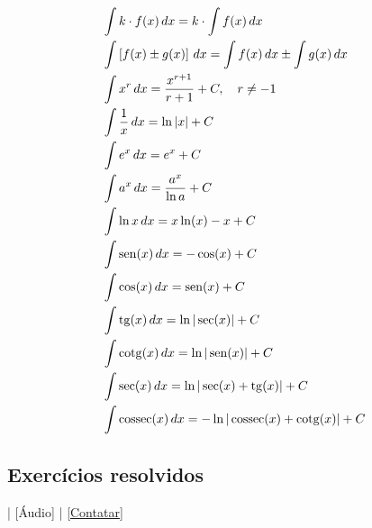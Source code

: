 \begin{small}
\begin{align}
  & \int k\cdot f(x)\,dx = k\cdot\int f(x)\,dx\\
  & \int \left[f(x)\pm g(x)\right]\,dx = \int f(x)\,dx \pm \int g(x)\,dx\\
  & \int x^r\,dx = \frac{x^{r+1}}{r+1} + C,\quad r\neq -1\\
  & \int \frac{1}{x}\,dx = \ln |x| + C \\
  & \int e^x\,dx = e^x + C \\
  & \int a^x\,dx = \frac{a^x}{\ln a} + C \\
  & \int \ln x \,dx = x\ln(x) - x + C \\
  & \int \operatorname{sen}(x)\,dx = -\cos(x) + C \\
  & \int \cos(x)\,dx = \operatorname{sen}(x) + C \\
  & \int \operatorname{tg}(x)\,dx = \ln|\sec(x)| + C \\
  & \int \operatorname{cotg}(x)\,dx = \ln|\operatorname{sen}(x)| + C \\
  & \int \sec(x)\,dx = \ln|\sec(x)+\operatorname{tg}(x)| + C \\
  & \int \operatorname{cossec}(x)\,dx = -\ln|\operatorname{cossec}(x)+\operatorname{cotg}(x)| + C
\end{align}
\end{small}

\subsection*{Exercícios resolvidos}

\begin{flushright}
  [Vídeo] | [Áudio] | \href{https://phkonzen.github.io/notas/contato.html}{[Contatar]}
\end{flushright}

